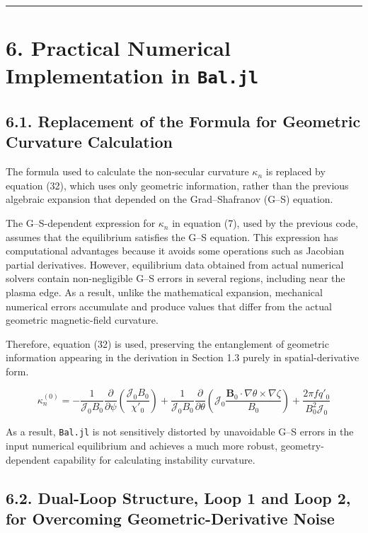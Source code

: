 \documentclass[11pt,a4paper]{article}
\begin{document}
\begin{center}\rule{0.5\linewidth}{0.5pt}\end{center}

\section{6. Practical Numerical Implementation in \texttt{Bal.jl}}\label{practical-numerical-implementation-in-baljl}

\subsection{6.1. Replacement of the Formula for Geometric Curvature Calculation}\label{replacement-of-formula-for-geometric-curvature-calculation}

The formula used to calculate the non-secular curvature \(\kappa_n\) is replaced by
equation (32), which uses only geometric information, rather than the previous
algebraic expansion that depended on the Grad--Shafranov (G--S) equation.

The G--S-dependent expression for \(\kappa_n\) in equation (7), used by the previous
code, assumes that the equilibrium satisfies the G--S equation. This expression has
computational advantages because it avoids some operations such as Jacobian partial
derivatives. However, equilibrium data obtained from actual numerical solvers
contain non-negligible G--S errors in several regions, including near the plasma
edge. As a result, unlike the mathematical expansion, mechanical numerical errors
accumulate and produce values that differ from the actual geometric magnetic-field
curvature.

Therefore, equation (32) is used, preserving the entanglement of geometric
information appearing in the derivation in Section 1.3 purely in spatial-derivative
form.

\[ \kappa_n^{(0)} = -\frac{1}{\mathcal{J}_0 B_0} \frac{\partial}{\partial\psi} \left( \frac{\mathcal{J}_0 B_0}{\chi'_0} \right) + \frac{1}{\mathcal{J}_0 B_0} \frac{\partial}{\partial\theta} \left( \mathcal{J}_0 \frac{\mathbf{B}_0 \cdot \nabla\theta \times \nabla\zeta}{B_0} \right) + \frac{2\pi f q'_0}{B_0^2 \mathcal{J}_0} \tag{32} \]

As a result, \texttt{Bal.jl} is not sensitively distorted by unavoidable G--S errors
in the input numerical equilibrium and achieves a much more robust,
geometry-dependent capability for calculating instability curvature.

\subsection{6.2. Dual-Loop Structure, Loop 1 and Loop 2, for Overcoming Geometric-Derivative Noise}\label{dual-loop-structure-for-overcoming-geometric-derivative-noise}
\end{document}
